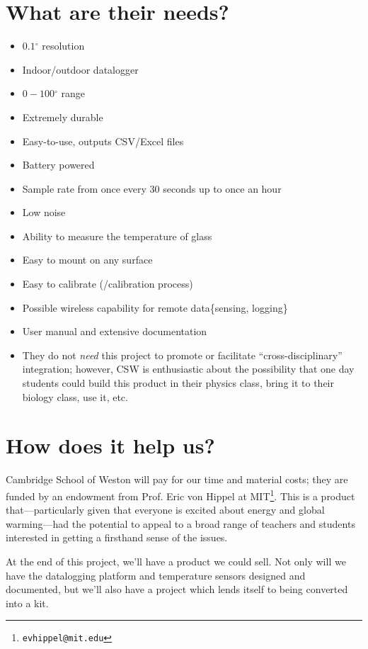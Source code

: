 \documentclass[11pt]{article}
\newcommand{\degree}{\ensuremath{^\circ}}
\begin{document}
\section{What are their needs?}
\begin{itemize}
\item $0.1 \degree$ resolution
\item Indoor/outdoor datalogger
\item $0-100 \degree$ range
\item Extremely durable
\item Easy-to-use, outputs CSV/Excel files
\item Battery powered
\item Sample rate from once every 30 seconds up to once an hour
\item Low noise
\item Ability to measure the temperature of glass
\item Easy to mount on any surface
\item Easy to calibrate (/calibration process)
\item Possible wireless capability for remote data\{sensing, logging\}
\item User manual and extensive documentation
\item They do not \textit{need} this project to promote or facilitate ``cross-disciplinary'' integration; however, CSW is enthusiastic about the possibility that one day students could build this product in their physics class, bring it to their biology class, use it, etc.
\end{itemize}


\section{How does it help us?}
Cambridge School of Weston will pay for our time and material costs; they are funded by an endowment from Prof. Eric von Hippel at MIT\footnote{\texttt{evhippel@mit.edu}}.  This is a product that---particularly given that everyone is excited about energy and global warming---had the potential to appeal to a broad range of teachers and students interested in getting a firsthand sense of the issues.  

At the end of this project, we'll have a product we could sell.  Not only will we have the datalogging platform and temperature sensors designed and documented, but we'll also have a project which lends itself to being converted into a kit.
\end{document}
